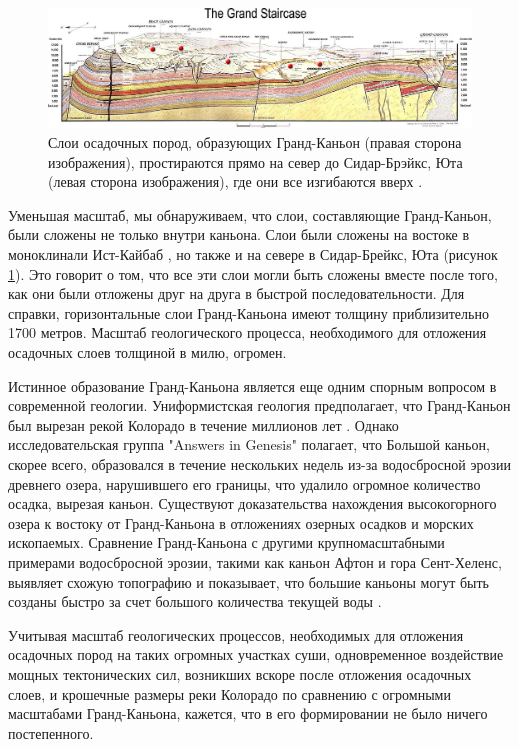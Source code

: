 \documentclass[10pt,twocolumn,letterpaper]{article}
\begin{document}
\begin{figure}
\begin{center}
\includegraphics[width=1\textwidth]{Grand_Staircase-big.jpg}
\end{center}
   \caption{Слои осадочных пород, образующих Гранд-Каньон (правая сторона изображения), простираются прямо на север до Сидар-Брэйкс, Юта (левая сторона изображения), где они все изгибаются вверх \cite{50}.}
\label{fig:4}
\end{figure}

Уменьшая масштаб, мы обнаруживаем, что слои, составляющие Гранд-Каньон, были сложены не только внутри каньона. Слои были сложены на востоке в моноклинали Ист-Кайбаб \cite{46}, но также и на севере в Сидар-Брейкс, Юта (рисунок \ref{fig:4}). Это говорит о том, что все эти слои могли быть сложены вместе после того, как они были отложены друг на друга в быстрой последовательности. Для справки, горизонтальные слои Гранд-Каньона имеют толщину приблизительно 1700 метров. Масштаб геологического процесса, необходимого для отложения осадочных слоев толщиной в милю, огромен.

Истинное образование Гранд-Каньона является еще одним спорным вопросом в современной геологии. Униформистская геология предполагает, что Гранд-Каньон был вырезан рекой Колорадо в течение миллионов лет \cite{47}. Однако исследовательская группа "Answers in Genesis" полагает, что Большой каньон, скорее всего, образовался в течение нескольких недель из-за водосбросной эрозии древнего озера, нарушившего его границы, что удалило огромное количество осадка, вырезая каньон. Существуют доказательства нахождения высокогорного озера к востоку от Гранд-Каньона в отложениях озерных осадков и морских ископаемых. Сравнение Гранд-Каньона с другими крупномасштабными примерами водосбросной эрозии, такими как каньон Афтон и гора Сент-Хеленс, выявляет схожую топографию и показывает, что большие каньоны могут быть созданы быстро за счет большого количества текущей воды \cite{48}.

Учитывая масштаб геологических процессов, необходимых для отложения осадочных пород на таких огромных участках суши, одновременное воздействие мощных тектонических сил, возникших вскоре после отложения осадочных слоев, и крошечные размеры реки Колорадо по сравнению с огромными масштабами Гранд-Каньона, кажется, что в его формировании не было ничего постепенного.
\end{document}
